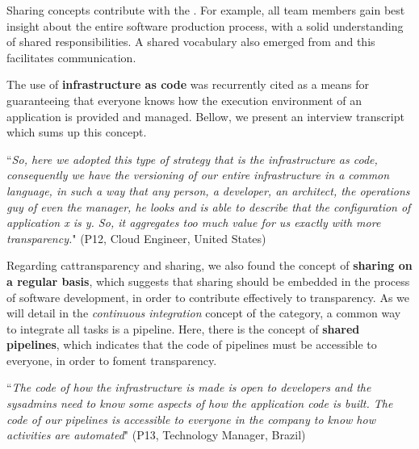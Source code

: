 Sharing concepts contribute with the \cc. For example,
all team members gain best insight about the entire software production
process, with a solid understanding of shared responsibilities. A shared vocabulary also
emerged from  and this facilitates communication.

The use of \textbf{infrastructure as code} was
recurrently cited as a means for guaranteeing that everyone knows how the execution environment of
an application is provided and managed. Bellow, we present an interview
transcript which sums up this concept.

\begin{mq}
``\emph{So, here we adopted this type of strategy that is the infrastructure as code,
consequently we have the versioning of our entire infrastructure in a common
language, in such a way that any person, a developer, an architect, the
operations guy of even the manager, he looks and is able to describe that the
configuration of application x is y. So, it aggregates too much value for us
exactly with more transparency.}" (P12, Cloud Engineer, United States)
\end{mq}

Regarding cat{transparency and sharing}, we also found the concept of \textbf{sharing on a regular basis}, which suggests
that sharing should be embedded in the process of software
development, in order to contribute effectively to transparency.
As we will detail in the \emph{continuous integration} concept of
the  category, a common way to integrate all tasks is a pipeline. Here, there is the
concept of \textbf{shared pipelines}, which indicates that the code of pipelines
must be accessible to everyone, in order to foment transparency.

\begin{mq}
``\emph{The code of how the infrastructure is
made is open to developers and the sysadmins need to know some aspects of how
the application code is built. The code of our pipelines is accessible to
everyone in the company to know how activities are automated}" (P13, Technology
Manager, Brazil)
\end{mq}





